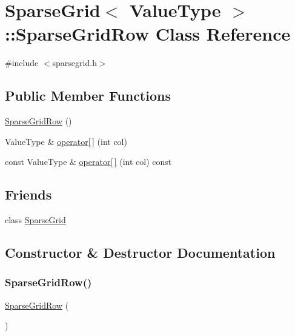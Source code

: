 \hypertarget{classSparseGrid_1_1SparseGridRow}{}\section{Sparse\+Grid$<$ Value\+Type $>$\+:\+:Sparse\+Grid\+Row Class Reference}
\label{classSparseGrid_1_1SparseGridRow}


{\ttfamily \#include $<$sparsegrid.\+h$>$}

\subsection*{Public Member Functions}
\begin{DoxyCompactItemize}
\item 
\mbox{\hyperlink{classSparseGrid_1_1SparseGridRow_aa5d4f6adba083df13f540e21a0c3d8e7}{Sparse\+Grid\+Row}} ()
\item 
Value\+Type \& \mbox{\hyperlink{classSparseGrid_1_1SparseGridRow_a8bb588385a542bce972f4d3ce343744c}{operator\mbox{[}$\,$\mbox{]}}} (int col)
\item 
const Value\+Type \& \mbox{\hyperlink{classSparseGrid_1_1SparseGridRow_a03dfd191e6703aee65e6170436ccd18d}{operator\mbox{[}$\,$\mbox{]}}} (int col) const
\end{DoxyCompactItemize}
\subsection*{Friends}
\begin{DoxyCompactItemize}
\item 
class \mbox{\hyperlink{classSparseGrid_1_1SparseGridRow_a5d011ba21988cd3a0eba846ebda2e527}{Sparse\+Grid}}
\end{DoxyCompactItemize}


\subsection{Constructor \& Destructor Documentation}
\mbox{\label{classSparseGrid_1_1SparseGridRow_aa5d4f6adba083df13f540e21a0c3d8e7}} 
\subsubsection{\texorpdfstring{Sparse\+Grid\+Row()}{SparseGridRow()}}
{\footnotesize\ttfamily \mbox{\hyperlink{classSparseGrid_1_1SparseGridRow}{Sparse\+Grid\+Row}} (\begin{DoxyParamCaption}{ }\end{DoxyParamCaption})\hspace{0.3cm}{\ttfamily [inline]}}



